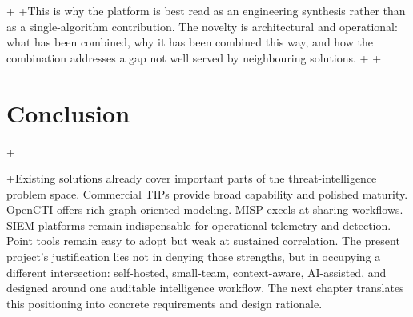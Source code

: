 +
+This is why the platform is best read as an engineering synthesis rather than as a single-algorithm contribution. The novelty is architectural and operational: what has been combined, why it has been combined this way, and how the combination addresses a gap not well served by neighbouring solutions.
+
+\section*{Conclusion}
+
+Existing solutions already cover important parts of the threat-intelligence problem space. Commercial TIPs provide broad capability and polished maturity. OpenCTI offers rich graph-oriented modeling. MISP excels at sharing workflows. SIEM platforms remain indispensable for operational telemetry and detection. Point tools remain easy to adopt but weak at sustained correlation. The present project's justification lies not in denying those strengths, but in occupying a different intersection: self-hosted, small-team, context-aware, AI-assisted, and designed around one auditable intelligence workflow. The next chapter translates this positioning into concrete requirements and design rationale.
